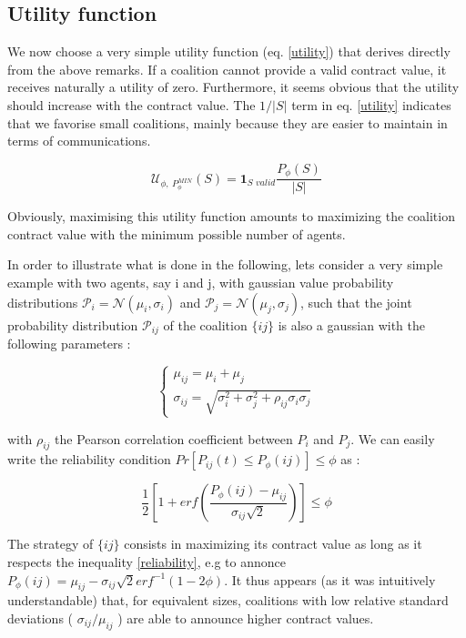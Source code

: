 \documentclass[conference]{IEEEtran}
\begin{document}
\subsection{Utility function}
We now choose a very simple utility function (eq. \ref{utility}) that derives directly from the above remarks. If a coalition cannot provide a valid contract value, it receives naturally a utility of zero. Furthermore, it seems obvious that the utility should increase with the contract value. The $ 1/|S| $ term in eq. \ref{utility} indicates that we favorise small coalitions, mainly because they are easier to maintain in terms of communications.

\begin{equation}
 \mathcal{U}_{\phi,\ P_{\phi}^{MIN}}(S) = \mathbf{1}_{\textit{S\ valid}} \dfrac{P_{\phi}(S)}{|S|} 
\label{utility}
\end{equation}

Obviously, maximising this utility function amounts to maximizing the coalition contract value with the minimum possible number of agents. 

In order to illustrate what is done in the following, lets consider a very simple example with two agents, say i and j, with gaussian value probability distributions $ \mathcal{P}_{i} = \mathcal{N}(\mu_{i}, \sigma_{i}) $ and $ \mathcal{P}_{j} = \mathcal{N}(\mu_{j}, \sigma_{j}) $, such that the joint probability distribution  $ \mathcal{P}_{ij} $ of the coalition $\{ij\}$ is also a gaussian with the following parameters :

\begin{equation}
\left\{ \begin{array}{lll}
		\mu_{ij} = \mu_{i} + \mu_{j} \\
		\sigma_{ij} = \sqrt{\sigma_{i}^{2} + \sigma_{j}^{2} + \rho_{ij}\sigma_{i}\sigma_{j}}
\end{array} \right.
\label{parameters}
\end{equation}

with $ \rho_{ij} $ the Pearson correlation coefficient between $ P_{i} $ and $ P_{j} $. We can easily write the reliability condition $ Pr[P_{ij}(t) \leq P_{\phi}(ij) ] \leq \phi $ as :

\begin{equation}
\dfrac{1}{2} \left[ 1+ erf \left( \dfrac{P_{\phi}(ij) - \mu_{ij}}{\sigma_{ij}\sqrt{2}} \right) \right] \leq \phi
\label{reliability}
\end{equation}

The strategy of $ \{ij\} $ consists in maximizing its contract value as long as it respects the inequality \ref{reliability}, e.g to annonce $ P_{\phi}(ij) = \mu_{ij} - \sigma_{ij}\sqrt{2}erf^{-1}(1-2 \phi ) $. It thus appears (as it was intuitively understandable) that, for equivalent sizes, coalitions with low relative standard deviations ( $ \sigma_{ij} / \mu_{ij} $ ) are able to announce higher contract values. 
\end{document}
